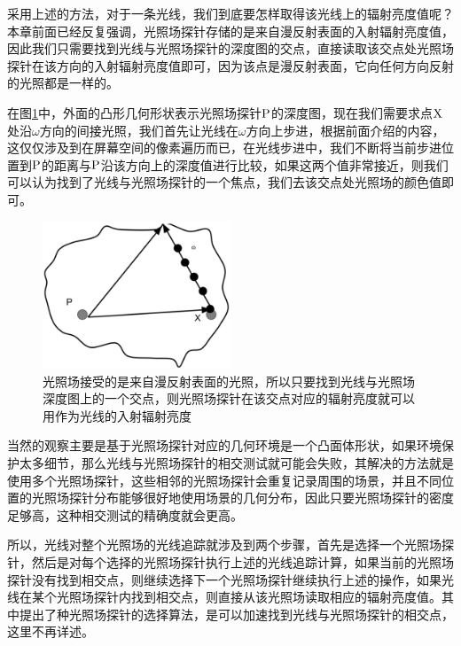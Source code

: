 采用上述的方法，对于一条光线，我们到底要怎样取得该光线上的辐射亮度值呢？本章前面已经反复强调，光照场探针存储的是来自漫反射表面的入射辐射亮度值，因此我们只需要找到光线与光照场探针的深度图的交点，直接读取该交点处光照场探针在该方向的入射辐射亮度值即可，因为该点是漫反射表面，它向任何方向反射的光照都是一样的。

在图\ref{f:pl-light-field-ray-marching}中，外面的凸形几何形状表示光照场探针${\rm P}$的深度图，现在我们需要求点${\rm X}$处沿$\omega$方向的间接光照，我们首先让光线在$\omega$方向上步进，根据前面介绍的内容，这仅仅涉及到在屏幕空间的像素遍历而已，在光线步进中，我们不断将当前步进位置到${\rm P}$的距离与${\rm P}$沿该方向上的深度值进行比较，如果这两个值非常接近，则我们可以认为找到了光线与光照场探针的一个焦点，我们去该交点处光照场的颜色值即可。

\begin{figure}
	\sidecaption
	\includegraphics[width=0.5\textwidth]{figures/pl/light-field-ray-marching}
	\caption{光照场接受的是来自漫反射表面的光照，所以只要找到光线与光照场深度图上的一个交点，则光照场探针在该交点对应的辐射亮度就可以用作为光线的入射辐射亮度}
	\label{f:pl-light-field-ray-marching}
\end{figure}

当然\cite{a:Real-TimeGlobalIlluminationusingPrecomputedLightFieldProbes}的观察主要是基于光照场探针对应的几何环境是一个凸面体形状，如果环境保护太多细节，那么光线与光照场探针的相交测试就可能会失败，其解决的方法就是使用多个光照场探针，这些相邻的光照场探针会重复记录周围的场景，并且不同位置的光照场探针分布能够很好地使用场景的几何分布，因此只要光照场探针的密度足够高，这种相交测试的精确度就会更高。

所以，光线对整个光照场的光线追踪就涉及到两个步骤，首先是选择一个光照场探针，然后是对每个选择的光照场探针执行上述的光线追踪计算，如果当前的光照场探针没有找到相交点，则继续选择下一个光照场探针继续执行上述的操作，如果光线在某个光照场探针内找到相交点，则直接从该光照场读取相应的辐射亮度值。其中\cite{a:LightProbeSelectionAlgorithmsforReal-TimeRenderingofLightFields}提出了种光照场探针的选择算法，是可以加速找到光线与光照场探针的相交点，这里不再详述。


